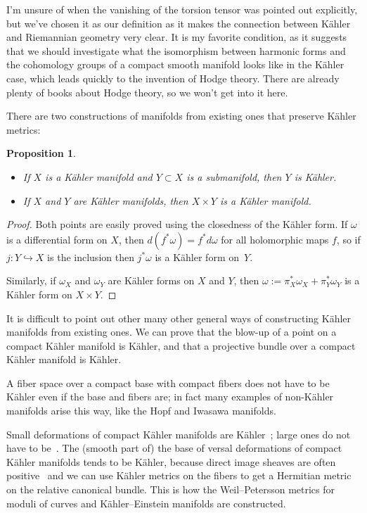 \documentclass[11pt]{article}
\newtheorem{prop}[theo]{Proposition}
\newtheorem*{proof}{Proof}
\begin{document}
I'm unsure of when the vanishing of the torsion tensor was pointed out explicitly, but we've chosen it as our definition as it makes the connection between K\"ahler and Riemannian geometry very clear. It is my favorite condition, as it suggests that we should investigate what the isomorphism between harmonic forms and the cohomology groups of a compact smooth manifold looks like in the K\"ahler case, which leads quickly to the invention of Hodge theory. There are already plenty of books about Hodge theory, so we won't get into it here.


There are two constructions of manifolds from existing ones that preserve K\"ahler metrics:

\begin{prop}
  \begin{itemize}
  \item If $X$ is a K\"ahler manifold and $Y \subset X$ is a submanifold, then $Y$ is K\"ahler.
  \item If $X$ and $Y$ are K\"ahler manifolds, then $X \times Y$ is a K\"ahler manifold.
  \end{itemize}
\end{prop}

\begin{proof}
  Both points are easily proved using the closedness of the K\"ahler form. If $\omega$ is a differential form on $X$, then $d(f^*\omega) = f^*d\omega$ for all holomorphic maps $f$, so if $j : Y \hookrightarrow X$ is the inclusion then $j^*\omega$ is a K\"ahler form on~$Y$.%

Similarly, if $\omega_X$ and $\omega_Y$ are K\"ahler forms on $X$ and $Y$, then $\omega := \pi_X^*\omega_X + \pi_Y^*\omega_Y$ is a K\"ahler form on $X \times Y$.
\end{proof}

It is difficult to point out other many other general ways of constructing K\"ahler manifolds from existing ones. We can prove that the blow-up of a point on a compact K\"ahler manifold is K\"ahler, and that a projective bundle over a compact K\"ahler manifold is K\"ahler.

A fiber space over a compact base with compact fibers does not have to be K\"ahler even if the base and fibers are; in fact many examples of non-K\"ahler manifolds arise this way, like the Hopf and Iwasawa manifolds.

Small deformations of compact K\"ahler manifolds are K\"ahler~\cite{kodaira1960deformations}; large ones do not have to be~\cite{hironaka1962example}. The (smooth part of) the base of versal deformations of compact K\"ahler manifolds tends to be K\"ahler, because direct image sheaves are often positive~\cite{berndtsson2009curvature} and we can use K\"ahler metrics on the fibers to get a Hermitian metric on the relative canonical bundle. This is how the Weil--Petersson metrics for moduli of curves and K\"ahler--Einstein manifolds are constructed.
\end{document}
